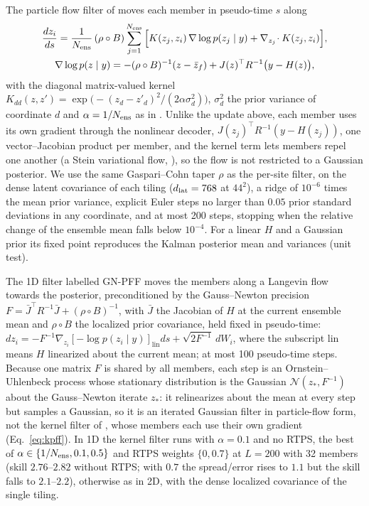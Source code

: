  The particle flow filter of
\citet{huvanleeuwen2021} moves each member in pseudo-time $s$ along
\begin{equation}
\begin{gathered}
  \frac{dz_i}{ds} = \frac{1}{N_{\mathrm{ens}}}\,(\rho\circ B)\sum_{j=1}^{N_{\mathrm{ens}}}
  \Big[K(z_j,z_i)\,\nabla\log p(z_j\mid y) + \nabla_{z_j}\!\cdot K(z_j,z_i)\Big],\\
  \nabla\log p(z\mid y) = -(\rho\circ B)^{-1}(z-\bar z_f) + J(z)^\top R^{-1}\big(y-H(z)\big),
\end{gathered}
  \label{eq:kpff}
\end{equation}
with the diagonal matrix-valued kernel $K_{dd}(z,z')=\exp\!\big(-(z_d-z'_d)^2/(2\alpha\sigma_d^2)\big)$,
$\sigma_d^2$ the prior variance of coordinate $d$ and $\alpha=1/N_{\mathrm{ens}}$ as in
\citet{huvanleeuwen2021}. Unlike the update above, each member uses its own
gradient through the nonlinear decoder, $J(z_j)^\top R^{-1}(y-H(z_j))$, one
vector--Jacobian product per member, and the kernel term lets members repel
one another (a Stein variational flow, \citealp{liuwang2016}), so the flow is not restricted to a Gaussian posterior. We use the
same Gaspari--Cohn taper $\rho$ as the per-site filter, on the dense latent
covariance of each tiling ($d_{\mathrm{lat}}=768$ at $44^2$), a ridge of $10^{-6}$ times
the mean prior variance, explicit Euler steps no larger than $0.05$ prior
standard deviations in any coordinate, and at most 200 steps, stopping when
the relative change of the ensemble mean falls below $10^{-4}$. For a linear
$H$ and a Gaussian prior its fixed point reproduces the Kalman posterior
mean and variances (unit test).

 The 1D filter labelled GN-PFF moves the members along a
Langevin flow towards the posterior, preconditioned by the Gauss--Newton precision
$F=\bar J^\top R^{-1}\bar J+(\rho\circ B)^{-1}$, with $\bar J$ the Jacobian of $H$ at the current ensemble
mean and $\rho\circ B$ the localized prior covariance, held fixed in pseudo-time:
$dz_i=-F^{-1}\nabla_{z_i}\!\left[-\log p(z_i\mid y)\right]_{\mathrm{lin}}ds+\sqrt{2F^{-1}}\,dW_i$, where the subscript
lin means $H$ linearized about the current mean; at most 100 pseudo-time steps. Because one matrix $F$ is
shared by all members, each step is an Ornstein--Uhlenbeck process whose stationary distribution is the
Gaussian $\mathcal N(z_*,F^{-1})$ about the Gauss--Newton iterate $z_*$: it relinearizes about the mean at
every step but samples a Gaussian, so it is an iterated Gaussian filter in particle-flow form, not the
kernel filter of \citet{huvanleeuwen2021}, whose members each use their own gradient
(Eq.~\eqref{eq:kpff}). In 1D the kernel filter runs with $\alpha=0.1$ and no RTPS, the best of
$\alpha\in\{1/N_{\mathrm{ens}},0.1,0.5\}$ and RTPS weights $\{0,0.7\}$ at $L=200$ with 32 members (skill $2.76$--$2.82$
without RTPS; with $0.7$ the spread/error rises to $1.1$ but the skill falls to $2.1$--$2.2$), otherwise as in 2D, with the dense localized covariance of the single
tiling.

